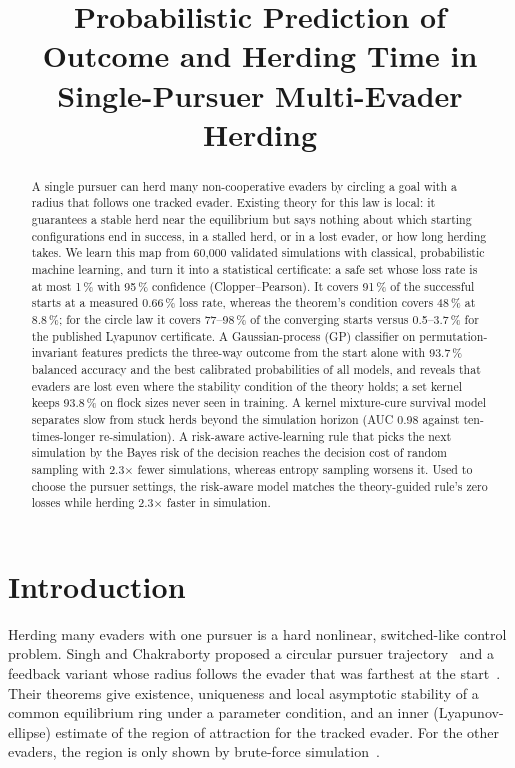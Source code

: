 \documentclass[conference]{IEEEtran}
\begin{document}
\title{Probabilistic Prediction of Outcome and Herding Time in Single-Pursuer Multi-Evader Herding}

\author{
}

\maketitle

\begin{abstract}
A single pursuer can herd many non-cooperative evaders by circling a goal with a radius that follows one tracked
evader. Existing theory for this law is local: it guarantees a stable herd near the equilibrium but says nothing
about which starting configurations end in success, in a stalled herd, or in a lost evader, or how long herding
takes. We learn this map from 60{,}000 validated simulations with classical, probabilistic machine learning, and
turn it into a statistical certificate: a safe set whose loss rate is at most 1\,\% with 95\,\% confidence
(Clopper--Pearson). It covers 91\,\% of the successful starts at a measured 0.66\,\% loss rate, whereas the theorem's
condition covers 48\,\% at 8.8\,\%; for the circle law it covers 77--98\,\% of the converging starts versus
0.5--3.7\,\% for the published Lyapunov certificate.
A Gaussian-process (GP) classifier on permutation-invariant features predicts the three-way outcome from the start
alone with 93.7\,\% balanced accuracy and the best calibrated probabilities of all models, and reveals that
evaders are lost even where the stability condition of the theory holds; a set kernel keeps 93.8\,\% on flock sizes
never seen in training. A kernel mixture-cure survival model separates slow from stuck herds beyond the simulation
horizon (AUC 0.98 against ten-times-longer re-simulation). A risk-aware active-learning rule that picks the next
simulation by the Bayes risk of the decision reaches the decision cost of random sampling with 2.3$\times$ fewer
simulations, whereas entropy sampling worsens it. Used to choose the pursuer settings, the risk-aware model matches the
theory-guided rule's zero losses while herding 2.3$\times$ faster in simulation.
\end{abstract}

\section{Introduction}
Herding many evaders with one pursuer is a hard nonlinear, switched-like control problem. Singh and Chakraborty
proposed a circular pursuer trajectory~\cite{singh2024cdc} and a feedback variant whose radius follows the evader
that was farthest at the start~\cite{singh2025arxiv}. Their theorems give existence, uniqueness and local
asymptotic stability of a common equilibrium ring under a parameter condition, and an inner (Lyapunov-ellipse)
estimate of the region of attraction for the tracked evader. For the other evaders, the region is only shown by
brute-force simulation~\cite{singh2025arxiv}.
\end{document}
